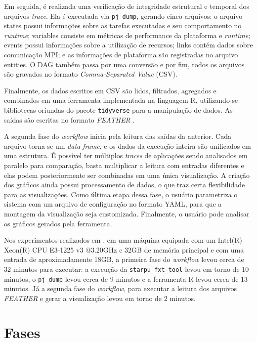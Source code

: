 Em seguida, é realizada uma verificação de integridade estrutural e temporal dos
arquivos \emph{trace}. Ela é executada via \texttt{pj\_dump}, gerando cinco 
arquivos: o arquivo states 
possui informações sobre as tarefas executadas e seu comportamento no 
\emph{runtime}; variables
consiste em métricas de performance da plataforma e \emph{runtime}; events 
possui informações sobre a 
utilização de recursos; links contém dados sobre comunicação MPI; e as 
informações de plataforma 
são registradas no arquivo entities. O DAG também passa por uma conversão e por 
fim, todos os 
arquivos são gravados no formato \emph{Comma-Separated Value} (CSV).

Finalmente, os dados escritos em CSV são lidos, filtrados, agregados e 
combinados em 
uma ferramenta implementada na linguagem R, utilizando-se bibliotecas oriundas 
do pacote 
\texttt{tidyverse} para a manipulação de dados. As saídas são escritas no 
formato \emph{FEATHER}
\cite{ref:feather}.

A segunda fase do \emph{workflow} inicia pela leitura das saídas da anterior. 
Cada arquivo
torna-se um \emph{data frame}, e os dados da execução inteira são unificados em 
uma estrutura.
É possível ter múltiplos \emph{traces} de aplicações sendo analisados em 
paralelo
para comparação, basta multiplicar a leitura com entradas diferentes e 
elas podem posteriormente ser combinadas em uma única visualização. A criação 
dos gráficos ainda 
possui processamento de dados, o que traz certa flexibilidade para as 
visualizações. Como última etapa dessa fase, o usuário 
parametriza o sistema com um arquivo de configuração no formato YAML, para que 
a 
montagem da visualização seja customizada. Finalmente, o usuário pode analisar 
os gráficos gerados pela ferramenta.

Nos experimentos realizados em \citet{ref:starvz}, em uma máquina equipada com 
um Intel(R) Xeon(R) 
CPU E3-1225 v3 @3.20GHz e 32GB de memória principal e com uma entrada de 
aproximadamente 18GB, a 
primeira fase do \emph{workflow} levou cerca de 32 minutos para executar: a 
execução da \texttt{starpu\_fxt\_tool}
levou em torno de 10 minutos, o \texttt{pj\_dump} levou cerca de 9 minutos e a 
ferramenta R levou cerca de 13
minutos. Já a segunda fase do \emph{workflow}, para executar a leitura dos 
arquivos \emph{FEATHER} e gerar
a visualização levou em torno de 2 minutos.

\section{Fases}\label{sect:starvz-phases}

